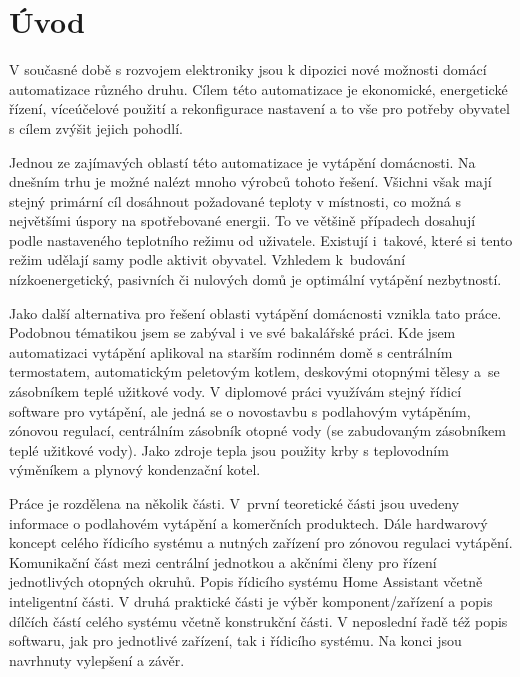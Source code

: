 \chapter{Úvod}

V současné době s rozvojem elektroniky jsou k dipozici nové možnosti domácí automatizace různého druhu. Cílem této automatizace je ekonomické, energetické řízení, víceúčelové použití a rekonfigurace nastavení a to vše pro potřeby obyvatel s cílem zvýšit jejich pohodlí.


Jednou ze zajímavých oblastí této automatizace je vytápění domácnosti. Na dnešním trhu je možné nalézt mnoho výrobců tohoto řešení. Všichni však mají stejný primární cíl dosáhnout požadované teploty v místnosti, co možná s největšími úspory na spotřebované energii. To ve většině případech dosahují podle nastaveného teplotního režimu od uživatele. Existují i~takové, které si tento režim udělají samy podle aktivit obyvatel. Vzhledem k~budování nízkoenergetický, pasivních či nulových domů je optimální vytápění nezbytností.

Jako další alternativa pro řešení oblasti vytápění domácnosti vznikla tato práce. Podobnou tématikou jsem se zabýval i ve své bakalářské práci. Kde jsem automatizaci vytápění aplikoval na starším rodinném domě s centrálním termostatem, automatickým peletovým kotlem, deskovými otopnými tělesy a~se zásobníkem teplé užitkové vody. V diplomové práci využívám stejný řídicí software pro vytápění, ale jedná se o novostavbu s podlahovým vytápěním, zónovou regulací, centrálním zásobník otopné vody (se zabudovaným zásobníkem teplé užitkové vody). Jako zdroje tepla jsou použity krby s teplovodním výměníkem a plynový kondenzační kotel.

Práce je rozdělena na několik části. V~první teoretické části jsou uvedeny informace o podlahovém vytápění a komerčních produktech. Dále hardwarový koncept celého řídicího systému a nutných zařízení pro zónovou regulaci vytápění. Komunikační část mezi centrální jednotkou a akčními členy pro řízení jednotlivých otopných okruhů. Popis řídicího systému Home Assistant včetně inteligentní části. V druhá praktické části je výběr komponent/zařízení a popis dílčích částí celého systému včetně konstrukční části. V neposlední řadě též popis softwaru, jak pro jednotlivé zařízení, tak i řídicího systému. Na konci jsou navrhnuty vylepšení a závěr.

\newpage
